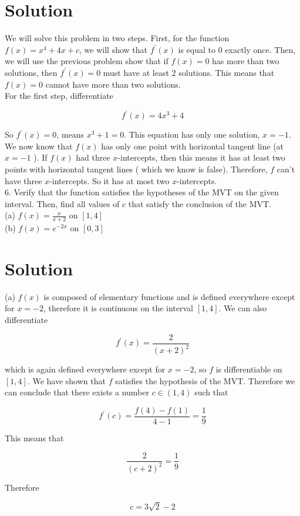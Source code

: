 \documentclass[10pt]{article}
\begin{document}
\section*{Solution}
We will solve this problem in two steps. First, for the function $f(x)=x^{4}+4 x+c$, we will show that $f^{\prime}(x)$ is equal to 0 exactly once. Then, we will use the previous problem show that if $f(x)=0$ has more than two solutions, then $f^{\prime}(x)=0$ must have at least 2 solutions. This means that $f(x)=0$ cannot have more than two solutions.\\
For the first step, differentiate

$$
f^{\prime}(x)=4 x^{3}+4
$$

So $f^{\prime}(x)=0$, means $x^{3}+1=0$. This equation has only one solution, $x=-1$.\\
We now know that $f(x)$ has only one point with horizontal tangent line (at $x=-1$ ). If $f(x)$ had three $x$-intercepts, then this means it has at least two points with horizontal tangent lines ( which we know is false). Therefore, $f$ can't have three $x$-intercepts. So it has at most two $x$-intercepts.\\
6. Verify that the function satisfies the hypotheses of the MVT on the given interval. Then, find all values of $c$ that satisfy the conclusion of the MVT.\\
(a) $f(x)=\frac{x}{x+2}$ on $[1,4]$\\
(b) $f(x)=e^{-2 x}$ on $[0,3]$

\section*{Solution}
(a) $f(x)$ is composed of elementary functions and is defined everywhere except for $x=-2$, therefore it is continuous on the interval $[1,4]$. We can also differentiate

$$
f^{\prime}(x)=\frac{2}{(x+2)^{2}}
$$

which is again defined everywhere except for $x=-2$, so $f$ is differentiable on $[1,4]$. We have shown that $f$ satisfies the hypothesis of the MVT. Therefore we can conclude that there exists a number $c \in(1,4)$ such that

$$
f^{\prime}(c)=\frac{f(4)-f(1)}{4-1}=\frac{1}{9}
$$

This means that

$$
\frac{2}{(c+2)^{2}}=\frac{1}{9}
$$

Therefore

$$
c=3 \sqrt{2}-2
$$
\end{document}
